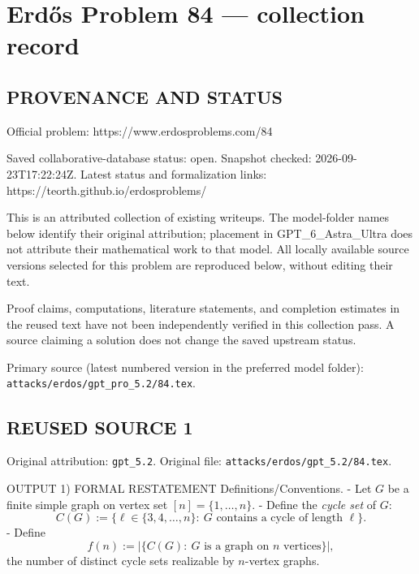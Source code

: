 \section*{Erd\H{o}s Problem 84 --- collection record}

\subsection*{PROVENANCE AND STATUS}
Official problem: https://www.erdosproblems.com/84

Saved collaborative-database status: open.
Snapshot checked: 2026-09-23T17:22:24Z.
Latest status and formalization links: https://teorth.github.io/erdosproblems/

This is an attributed collection of existing writeups. The model-folder names below identify their original attribution; placement in GPT\_6\_Astra\_Ultra does not attribute their mathematical work to that model. All locally available source versions selected for this problem are reproduced below, without editing their text.

Proof claims, computations, literature statements, and completion estimates in the reused text have not been independently verified in this collection pass. A source claiming a solution does not change the saved upstream status.

Primary source (latest numbered version in the preferred model folder): \texttt{attacks/erdos/gpt\_pro\_5.2/84.tex}.

\subsection*{REUSED SOURCE 1}
Original attribution: \texttt{gpt\_5.2}.
Original file: \texttt{attacks/erdos/gpt\_5.2/84.tex}.


OUTPUT
1) FORMAL RESTATEMENT
Definitions/Conventions.
- Let $G$ be a finite simple graph on vertex set $[n]=\{1,\dots,n\}$.
- Define the \emph{cycle set} of $G$:
\[C(G):=\{\ell\in\{3,4,\dots,n\}:\ G\text{ contains a cycle of length }\ell\}.\]
- Define
\[f(n):=\big|\{C(G):\ G\text{ is a graph on }n\text{ vertices}\}\big|,\]
the number of distinct cycle sets realizable by $n$-vertex graphs.

